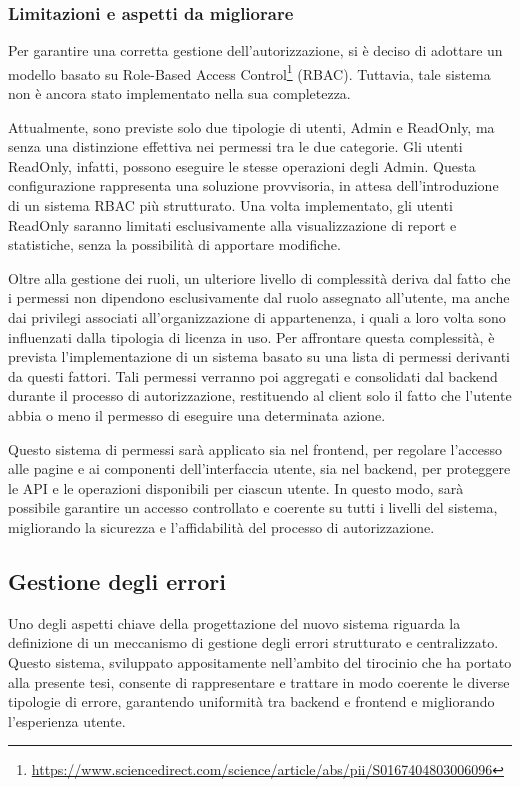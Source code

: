 \subsubsection{Limitazioni e aspetti da migliorare}
Per garantire una corretta gestione dell'autorizzazione, si è deciso di adottare un modello basato su Role-Based Access Control\footnote{\url{https://www.sciencedirect.com/science/article/abs/pii/S0167404803006096}} (RBAC). Tuttavia, tale sistema non è ancora stato implementato nella sua completezza.

Attualmente, sono previste solo due tipologie di utenti, Admin e ReadOnly, ma senza una distinzione effettiva nei permessi tra le due categorie. Gli utenti ReadOnly, infatti, possono eseguire le stesse operazioni degli Admin. Questa configurazione rappresenta una soluzione provvisoria, in attesa dell'introduzione di un sistema RBAC più strutturato. Una volta implementato, gli utenti ReadOnly saranno limitati esclusivamente alla visualizzazione di report e statistiche, senza la possibilità di apportare modifiche.

Oltre alla gestione dei ruoli, un ulteriore livello di complessità deriva dal fatto che i permessi non dipendono esclusivamente dal ruolo assegnato all'utente, ma anche dai privilegi associati all’organizzazione di appartenenza, i quali a loro volta sono influenzati dalla tipologia di licenza in uso. Per affrontare questa complessità, è prevista l'implementazione di un sistema basato su una lista di permessi derivanti da questi fattori. Tali permessi verranno poi aggregati e consolidati dal backend durante il processo di autorizzazione, restituendo al client solo il fatto che l'utente abbia o meno il permesso di eseguire una determinata azione.

Questo sistema di permessi sarà applicato sia nel frontend, per regolare l'accesso alle pagine e ai componenti dell'interfaccia utente, sia nel backend, per proteggere le API e le operazioni disponibili per ciascun utente. In questo modo, sarà possibile garantire un accesso controllato e coerente su tutti i livelli del sistema, migliorando la sicurezza e l’affidabilità del processo di autorizzazione.

\subsection{Gestione degli errori}
Uno degli aspetti chiave della progettazione del nuovo sistema riguarda la definizione di un meccanismo di gestione degli errori strutturato e centralizzato. Questo sistema, sviluppato appositamente nell’ambito del tirocinio che ha portato alla presente tesi, consente di rappresentare e trattare in modo coerente le diverse tipologie di errore, garantendo uniformità tra backend e frontend e migliorando l’esperienza utente.

